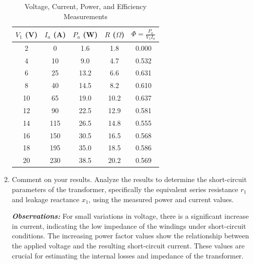 \documentclass[12pt,a4paper]{report}
\begin{document}
\begin{enumerate}
    \begin{table}[H]
        \centering
        \caption{Voltage, Current, Power, and Efficiency Measurements}
        \begin{tabular}{|c|c|c|c|c|}
        \hline
        $V_1$ (V) & $I_a$ (A) & $P_a$ (W) & $R$ ($\Omega$) & $\Phi = \frac{P_a}{V_1 I_a}$ \\ \hline
        2         & 0         & 1.6       & 1.8            & 0.000                          \\ \hline
        4         & 10        & 9.0       & 4.7            & 0.532                          \\ \hline
        6         & 25        & 13.2      & 6.6            & 0.631                          \\ \hline
        8         & 40        & 14.5      & 8.2            & 0.610                          \\ \hline
        10        & 65        & 19.0      & 10.2           & 0.637                          \\ \hline
        12        & 90        & 22.5      & 12.9           & 0.581                          \\ \hline
        14        & 115       & 26.5      & 14.8           & 0.555                          \\ \hline
        16        & 150       & 30.5      & 16.5           & 0.568                          \\ \hline
        18        & 195       & 35.0      & 18.5           & 0.586                          \\ \hline
        20        & 230       & 38.5      & 20.2           & 0.569                          \\ \hline
        \end{tabular}
        \end{table}
        

    \item Comment on your results. Analyze the results to determine the short-circuit parameters of the transformer, specifically the equivalent series resistance \( r_1 \) and leakage reactance \( x_1 \), using the measured power and current values.

    \textbf{\textit{Observations:}} For small variations in voltage, there is a significant increase in current, indicating the low impedance of the windings under short-circuit conditions. The increasing power factor values show the relationship between the applied voltage and the resulting short-circuit current. These values are crucial for estimating the internal losses and impedance of the transformer.
    

\end{enumerate}
\end{document}
